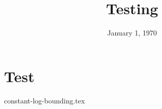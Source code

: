 \documentclass[11pt]{exam}
\title{Testing}
\date{January 1, 1970}
\begin{document}
\maketitle

\section{Test}
\begin{questions}
{constant-log-bounding.tex}
\end{questions}
\end{document}
